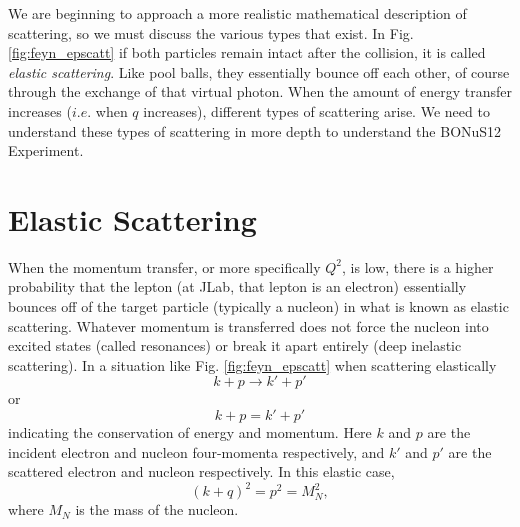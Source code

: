 We are beginning to approach a more realistic mathematical description of scattering, so we must discuss the various types that exist. In Fig. \ref{fig:feyn_epscatt} if both particles remain intact after the collision, it is called \textit{elastic scattering}. Like pool balls, they essentially bounce off each other, of course through the exchange of that virtual photon. When the amount of energy transfer increases ($i.e.$ when $q$ increases), different types of scattering arise. We need to understand these types of scattering in more depth to understand the BONuS12 Experiment.
\newpage
\section{Elastic Scattering}
When the momentum transfer, or more specifically $Q^2$, is low, there is a higher probability that the lepton (at JLab, that lepton is an electron) essentially bounces off of the target particle (typically a nucleon) in what is known as elastic scattering. Whatever momentum is transferred does not force the nucleon into excited states (called resonances) or break it apart entirely (deep inelastic scattering). In a situation like Fig. \ref{fig:feyn_epscatt} when scattering elastically
\begin{equation}
k+p \longrightarrow k' + p'
\end{equation}
or
\begin{equation}
k + p = k' + p'
\end{equation}
indicating the conservation of energy and momentum. Here $k$ and $p$ are the incident electron and nucleon four-momenta respectively, and $k'$ and $p'$ are the scattered electron and nucleon respectively. In this elastic case,
\begin{equation}
(k+q)^2 = p^2 = M_N^2,
\end{equation}
where $M_N$ is the mass of the nucleon. 

